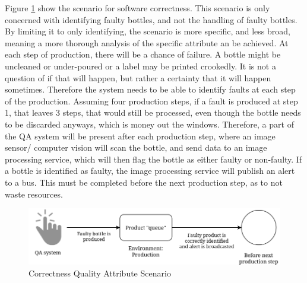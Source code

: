 Figure \ref{fig:CQAS} show the scenario for software correctness. This scenario is only concerned with identifying faulty bottles, and not the handling of faulty bottles. By limiting it to only identifying, the scenario is more specific, and less broad, meaning a more thorough analysis of the specific attribute an be achieved. At each step of production, there will be a chance of failure. A bottle might be uncleaned or under-poured or a label may be printed crookedly. It is not a question of if that will happen, but rather a certainty that it will happen sometimes. Therefore the system needs to be able to identify faults at each step of the production. Assuming four production steps, if a fault is produced at step 1, that leaves 3 steps, that would still be processed, even though the bottle needs to be discarded anyways, which is money out the windows. Therefore, a part of the QA system will be present after each production step, where an image sensor/ computer vision will scan the bottle, and send data to an image processing service, which will then flag the bottle as either faulty or non-faulty. If a bottle is identified as faulty, the image processing service will publish an alert to a bus. This must be completed before the next production step, as to not waste resources. 

\begin{figure}[h]
    \centering
    \includegraphics[width=\linewidth]{Images/Correctness.png}
    \caption{Correctness Quality Attribute Scenario}
    \label{fig:CQAS}
\end{figure}


